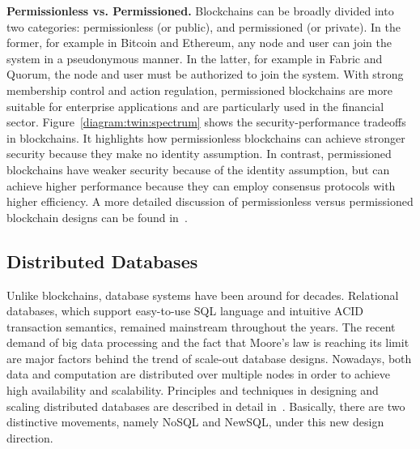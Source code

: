 \textbf{Permissionless vs. Permissioned.} Blockchains can be broadly divided into two categories: permissionless (or public), and permissioned (or
private). In the former, for example in Bitcoin and Ethereum, any node and user can join the system in a pseudonymous manner. In the latter, for example in Fabric and Quorum, the node and user must be authorized to join the system. With strong membership control and action regulation, permissioned blockchains are more suitable for enterprise applications and are particularly used in the financial sector.
Figure~\ref{diagram:twin:spectrum} shows the security-performance tradeoffs in blockchains. It highlights how permissionless
blockchains can achieve stronger security because they make no identity assumption. In contrast, permissioned
blockchains have weaker security because of the identity assumption, but can achieve higher performance
because they can employ consensus protocols with higher efficiency. A more detailed discussion of permissionless versus permissioned blockchain designs can be found
in~\cite{dinh2018untangling,dinh2017blockbench}.


\subsection{Distributed Databases}

Unlike blockchains, database systems have been around for decades.  Relational databases, which  
support easy-to-use SQL language and intuitive ACID transaction semantics, remained mainstream throughout the years. The recent demand of big data processing and the fact that Moore's law is reaching its limit are major factors
behind the trend of scale-out database designs. Nowadays, both data and computation are distributed over multiple nodes
in order to achieve high availability and scalability. Principles and techniques in designing and scaling distributed databases are described in detail in~\cite{ozsu2011principles}. 
Basically, there are two distinctive movements, namely NoSQL and NewSQL, under this new design direction.


